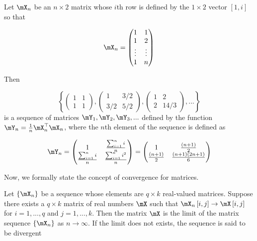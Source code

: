 \begin{example}\label{example:sequence_matrix}
Let $\mX_n$ be an $n\times 2$ matrix whose $i$th row is defined by the $1\times 2$ vector $\left[1, i\right]$ so that

\begin{equation*}
\mX_n = \begin{pmatrix}
  1 & 1 \\
  1 & 2 \\
  \vdots & \vdots\\
  1 & n
\end{pmatrix}
\end{equation*}

Then

\begin{equation*}
\left\lbrace \begin{pmatrix}
1 & 1\\
1 & 1
\end{pmatrix},
\begin{pmatrix}
  1 & 3/2 \\
  3/2 & 5/2
\end{pmatrix},
\begin{pmatrix}
1 & 2 \\
2 & 14/3
\end{pmatrix}, ...
\right\rbrace
\end{equation*}
%
is a sequence of matrices $\mY_1, \mY_2, \mY_3,...$ defined by the function $\mY_n = \frac{1}{n}\mX_n^\top\mX_n$, where the $n$th element of the sequence is defined as

\begin{equation*}
\mY_n = \begin{pmatrix}
1 & \frac{\sum_{i = 1}^n i}{n} \\
\frac{\sum_{i = 1}^n i}{n} & \frac{\sum_{i = 1}^n i^2}{n}
\end{pmatrix} = 
\begin{pmatrix}
1 & \frac{(n + 1)}{2} \\
\frac{(n + 1)}{2}& \frac{(n +1)(2n +1)}{6}
\end{pmatrix}
\end{equation*}
\end{example}

Now, we formally state the concept of convergence for matrices. 

\begin{definition}
Let $\left\lbrace\mX_n \right\rbrace$ be a sequence whose elements are $q\times k$ real-valued matrices. Suppose there exists a $q\times k$ matrix of real numbers $\mX$ such that $\mX_n\left[i, j\right]\to \mX\left[i, j\right]$ for $i = 1,...,q$ and $j = 1,...,k$. Then the matrix $\mX$ is the limit of the matrix sequence $\left\lbrace\mX_n \right\rbrace$ as $n\to \infty$. If the limit does not exists, the sequence is said to be divergent
\end{definition}

